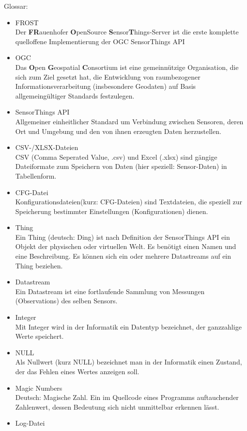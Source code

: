 \documentclass[12 pt]{article}
\begin{document}
Glossar:
\begin{itemize}
\item FROST \\
	Der \textbf{FR}auenhofer \textbf{O}penSource \textbf{S}ensor\textbf{T}hings-Server ist die erste komplette quelloffene Implementierung der OGC SensorThings API
\item OGC \\
	Das \textbf{O}pen \textbf{G}eospatial \textbf{C}onsortium ist eine gemeinnützige Organisation, die sich zum Ziel gesetzt hat, die Entwicklung von raumbezogener Informationsverarbeitung (insbesondere Geodaten) auf Basis allgemeingültiger Standards festzulegen.
\item SensorThings API \\
	Allgemeiner einheitlicher Standard um Verbindung zwischen Sensoren, deren Ort und Umgebung und den von ihnen erzeugten Daten herzustellen.
\item CSV-/XLSX-Dateien \\
	CSV (Comma Seperated Value, .csv) und Excel (.xlsx) sind gängige Dateiformate zum Speichern von Daten (hier speziell: Sensor-Daten) in Tabellenform.
\item CFG-Datei \\
	Konfigurationsdateien(kurz: CFG-Dateien) sind Textdateien, die speziell zur Speicherung bestimmter Einstellungen (Konfigurationen) dienen.
\item Thing \\
	Ein Thing (deutsch: Ding) ist nach Definition der SensorThings API ein Objekt der physischen oder virtuellen Welt. Es benötigt einen Namen und eine Beschreibung. Es können sich ein oder mehrere Datastreams auf ein Thing beziehen.
\item Datastream \\
	Ein Datastream ist eine fortlaufende Sammlung von Messungen (Observations) des selben Sensors.
\item Integer \\
	Mit Integer wird in der Informatik ein Datentyp bezeichnet, der ganzzahlige Werte speichert.
\item NULL \\
	Als Nullwert (kurz NULL) bezeichnet man in der Informatik einen Zustand, der das Fehlen eines Wertes anzeigen soll.
\item Magic Numbers \\
	Deutsch: Magische Zahl. Ein im Quellcode eines Programms auftauchender Zahlenwert, dessen Bedeutung sich nicht unmittelbar erkennen lässt.
\item Log-Datei \\

\end{itemize}
\end{document}
